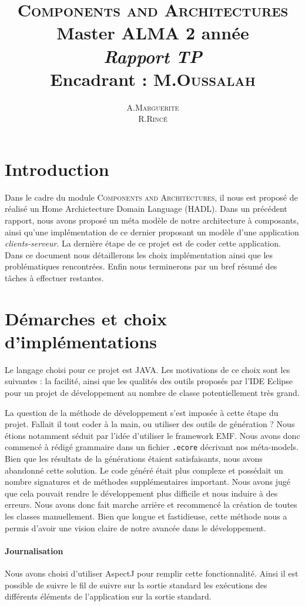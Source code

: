\documentclass[12pt]{article}
\title{ {\huge \textsc{Components and Architectures}} \\  Master ALMA 2\up{eme} année  \\ \emph{Rapport TP}\\{\small Encadrant :  M.\textsc{Oussalah}}}
\author{A.\textsc{Marguerite} \\ R.\textsc{Rincé}}
\begin{document}
\maketitle
\renewcommand{\labelitemi}{$\bullet$} 



\section{Introduction}\label{sec:intro}
Dans le cadre du module \textsc{Components and Architectures}, il nous est proposé de réalisé un Home Archictecture Domain Language (HADL). Dans un précédent rapport, nous avons proposé un méta modèle de notre architecture à composants, ainsi qu'une implémentation de ce dernier proposant un modèle d'une application \textit{clients-serveur}. La dernière étape de ce projet est de coder cette application. Dans ce document nous détaillerons les choix implémentation ainsi que les problématiques rencontrées. Enfin nous terminerons par un bref résumé des tâches à effectuer restantes.
\section{Démarches et choix d'implémentations}\label{sec:pblm}
Le langage choisi pour ce projet est JAVA. Les motivations de ce choix sont les suivantes : la facilité, ainsi que les qualités des outils proposés par l'IDE Eclipse pour un projet de développement au nombre de classe potentiellement très grand. 

La question de la méthode de développement s'est imposée à cette étape du projet. Fallait il tout coder à la main, ou utiliser des outils de génération ? Nous étions notamment séduit par l'idée d'utiliser le framework EMF. Nous avons donc commencé à rédigé grammaire dans un fichier \verb+.ecore+ décrivant nos méta-models. Bien que les résultats de la générations étaient satisfaisants, nous avons abandonné cette solution. Le code généré était plus complexe et possédait un nombre signatures et de méthodes supplémentaires important. Nous avons jugé que cela pouvait rendre le développement plus difficile et nous induire  à des erreurs. Nous avons donc fait marche arrière et recommencé la création de toutes les classes manuellement. Bien que longue et fastidieuse, cette méthode nous a permis d'avoir une vision claire de notre avancée dans le développement.

\paragraph{Journalisation}
Nous avons choisi d'utiliser AspectJ pour remplir cette fonctionnalité.  Ainsi il est possible de suivre le fil de suivre sur la sortie standard les exécutions des différents éléments de l'application sur la sortie standard. 
\end{document}
